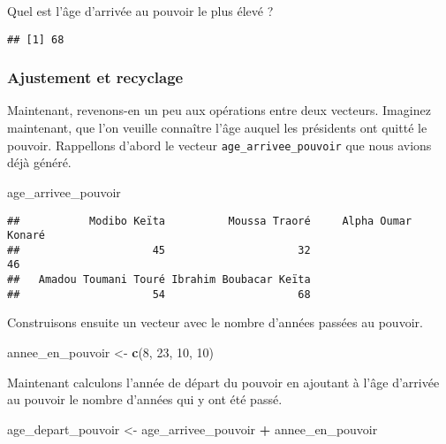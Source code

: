 \documentclass[]{book}
\newenvironment{Shaded}{\begin{snugshade}}{\end{snugshade}}
\newcommand{\KeywordTok}[1]{\textcolor[rgb]{0.13,0.29,0.53}{\textbf{#1}}}
\newcommand{\DecValTok}[1]{\textcolor[rgb]{0.00,0.00,0.81}{#1}}
\newcommand{\StringTok}[1]{\textcolor[rgb]{0.31,0.60,0.02}{#1}}
\newcommand{\OperatorTok}[1]{\textcolor[rgb]{0.81,0.36,0.00}{\textbf{#1}}}
\newcommand{\NormalTok}[1]{#1}
\begin{document}
Quel est l'âge d'arrivée au pouvoir le plus élevé ?

\begin{verbatim}
## [1] 68
\end{verbatim}

\subsubsection{Ajustement et recyclage}\label{ajustement-et-recyclage}

Maintenant, revenons-en un peu aux opérations entre deux vecteurs.
Imaginez maintenant, que l'on veuille connaître l'âge auquel les
présidents ont quitté le pouvoir. Rappellons d'abord le vecteur
\texttt{age\_arrivee\_pouvoir} que nous avions déjà généré.

\begin{Shaded}
\begin{Highlighting}[]
\NormalTok{age_arrivee_pouvoir}
\end{Highlighting}
\end{Shaded}

\begin{verbatim}
##           Modibo Keïta          Moussa Traoré     Alpha Oumar Konaré 
##                     45                     32                     46 
##   Amadou Toumani Touré Ibrahim Boubacar Keïta 
##                     54                     68
\end{verbatim}

Construisons ensuite un vecteur avec le nombre d'années passées au
pouvoir.

\begin{Shaded}
\begin{Highlighting}[]
\NormalTok{annee_en_pouvoir <-}\StringTok{ }\KeywordTok{c}\NormalTok{(}\DecValTok{8}\NormalTok{, }\DecValTok{23}\NormalTok{, }\DecValTok{10}\NormalTok{, }\DecValTok{10}\NormalTok{)}
\end{Highlighting}
\end{Shaded}

Maintenant calculons l'année de départ du pouvoir en ajoutant à l'âge
d'arrivée au pouvoir le nombre d'années qui y ont été passé.

\begin{Shaded}
\begin{Highlighting}[]
\NormalTok{age_depart_pouvoir <-}\StringTok{ }\NormalTok{age_arrivee_pouvoir }\OperatorTok{+}\StringTok{ }\NormalTok{annee_en_pouvoir}
\end{Highlighting}
\end{Shaded}
\end{document}
